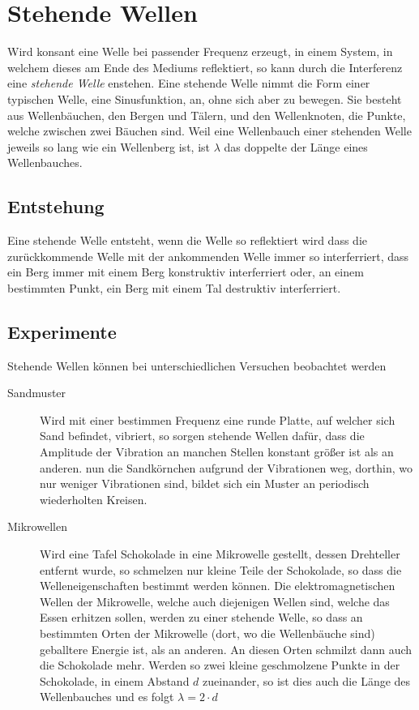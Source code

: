 \documentclass{article}
\begin{document}
\section{Stehende Wellen} 
Wird konsant eine Welle bei passender Frequenz erzeugt, in einem System, in welchem dieses am Ende des Mediums reflektiert, so kann durch die Interferenz eine \emph{stehende Welle} enstehen. Eine stehende Welle nimmt die Form einer typischen Welle, eine Sinusfunktion, an, ohne sich aber zu bewegen.
Sie besteht aus Wellenbäuchen, den Bergen und Tälern, und den Wellenknoten, die Punkte, welche zwischen zwei Bäuchen sind. Weil eine Wellenbauch einer stehenden Welle jeweils so lang wie ein Wellenberg ist, ist $\lambda$ das doppelte der Länge eines Wellenbauches.  
 
\subsection{Entstehung}
Eine stehende Welle entsteht, wenn die Welle so reflektiert wird dass die zurückkommende Welle mit der ankommenden Welle immer so interferriert, dass ein Berg immer mit einem Berg konstruktiv interferriert oder, an einem bestimmten Punkt, ein Berg mit einem Tal destruktiv interferriert.
 
\subsection{Experimente}
Stehende Wellen können bei unterschiedlichen Versuchen beobachtet werden
\begin{description}
 \item[Sandmuster] Wird mit einer bestimmen Frequenz eine runde Platte, auf welcher sich Sand befindet, vibriert, so sorgen stehende Wellen dafür, dass die Amplitude der Vibration an manchen Stellen konstant größer ist als an anderen.  nun die Sandkörnchen aufgrund der Vibrationen weg, dorthin, wo nur weniger Vibrationen sind, bildet sich ein Muster an periodisch wiederholten Kreisen.
 \item[Mikrowellen] Wird eine Tafel Schokolade in eine Mikrowelle gestellt, dessen Drehteller entfernt wurde, so schmelzen nur kleine Teile der Schokolade, so dass die Welleneigenschaften bestimmt werden können. Die elektromagnetischen Wellen der Mikrowelle, welche auch diejenigen Wellen sind, welche das Essen erhitzen sollen, werden zu einer stehende Welle, so dass an bestimmten Orten der Mikrowelle (dort, wo die Wellenbäuche sind) geballtere Energie ist, als an anderen. An diesen Orten schmilzt dann auch die Schokolade mehr. \newline 
Werden so zwei kleine geschmolzene Punkte in der Schokolade, in einem Abstand $d$ zueinander, so ist dies auch die Länge des Wellenbauches und es folgt $\lambda = 2 \cdot d$ 
\end{description} 
\end{document}
